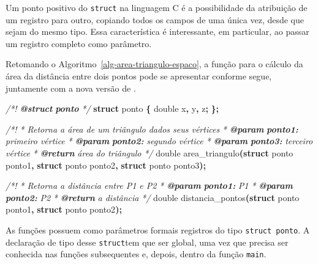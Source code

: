 \documentclass[
  11pt,
  a4paper,
]{scrbook}
\newenvironment{Shaded}{\begin{snugshade}}{\end{snugshade}}
\newcommand{\AnnotationTok}[1]{\textcolor[rgb]{0.56,0.35,0.01}{\textbf{\textit{#1}}}}
\newcommand{\CommentTok}[1]{\textcolor[rgb]{0.56,0.35,0.01}{\textit{#1}}}
\newcommand{\CommentVarTok}[1]{\textcolor[rgb]{0.56,0.35,0.01}{\textbf{\textit{#1}}}}
\newcommand{\DataTypeTok}[1]{\textcolor[rgb]{0.13,0.29,0.53}{#1}}
\newcommand{\KeywordTok}[1]{\textcolor[rgb]{0.13,0.29,0.53}{\textbf{#1}}}
\newcommand{\NormalTok}[1]{#1}
\newcommand{\OperatorTok}[1]{\textcolor[rgb]{0.81,0.36,0.00}{\textbf{#1}}}
\begin{document}
Um ponto positivo do \texttt{struct} na linguagem C é a possibilidade da
atribuição de um registro para outro, copiando todos os campos de uma
única vez, desde que sejam do mesmo tipo. Essa característica é
interessante, em particular, ao passar um registro completo como
parâmetro.

Retomando o Algoritmo~\ref{alg-area-triangulo-espaco}, a função para o
cálculo da área da distância entre dois pontos pode se apresentar
conforme segue, juntamente com a nova versão de
.

\begin{Shaded}
\begin{Highlighting}[]
\CommentTok{/*! }\AnnotationTok{@struct}\CommentTok{ }\CommentVarTok{ponto}\CommentTok{ */}
\KeywordTok{struct}\NormalTok{ ponto }\OperatorTok{\{}
    \DataTypeTok{double}\NormalTok{ x}\OperatorTok{,}\NormalTok{ y}\OperatorTok{,}\NormalTok{ z}\OperatorTok{;}
\OperatorTok{\};}

\CommentTok{/*!}
\CommentTok{ * Retorna a área de um triângulo dados seus vértices}
\CommentTok{ * }\AnnotationTok{@param}\CommentTok{ }\CommentVarTok{ponto1:}\CommentTok{ primeiro vértice}
\CommentTok{ * }\AnnotationTok{@param}\CommentTok{ }\CommentVarTok{ponto2:}\CommentTok{ segundo vértice}
\CommentTok{ * }\AnnotationTok{@param}\CommentTok{ }\CommentVarTok{ponto3:}\CommentTok{ terceiro vértice}
\CommentTok{ * }\AnnotationTok{@return}\CommentTok{ área do triângulo}
\CommentTok{ */}
\DataTypeTok{double}\NormalTok{ area\_triangulo}\OperatorTok{(}\KeywordTok{struct}\NormalTok{ ponto ponto1}\OperatorTok{,}
                      \KeywordTok{struct}\NormalTok{ ponto ponto2}\OperatorTok{,}
                      \KeywordTok{struct}\NormalTok{ ponto ponto3}\OperatorTok{);}

\CommentTok{/*!}
\CommentTok{ * Retorna a distância entre P1 e P2}
\CommentTok{ * }\AnnotationTok{@param}\CommentTok{ }\CommentVarTok{ponto1:}\CommentTok{ P1}
\CommentTok{ * }\AnnotationTok{@param}\CommentTok{ }\CommentVarTok{ponto2:}\CommentTok{ P2}
\CommentTok{ * }\AnnotationTok{@return}\CommentTok{ a distância}
\CommentTok{ */}
\DataTypeTok{double}\NormalTok{ distancia\_pontos}\OperatorTok{(}\KeywordTok{struct}\NormalTok{ ponto ponto1}\OperatorTok{,} \KeywordTok{struct}\NormalTok{ ponto ponto2}\OperatorTok{);}
\end{Highlighting}
\end{Shaded}

As funções possuem como parâmetros formais registros do tipo
\texttt{struct\ ponto}. A declaração de tipo desse \texttt{struct}tem
que ser global, uma vez que precisa ser conhecida nas funções
subsequentes e, depois, dentro da função \texttt{main}.
\end{document}
